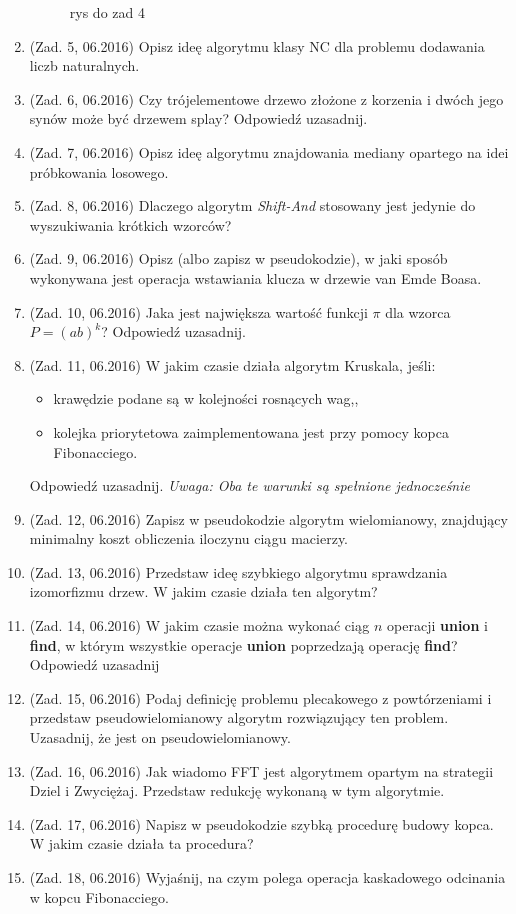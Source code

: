 \documentclass[10pt]{article}%
\begin{document}
\begin{enumerate}
\begin{figure}[H]
\caption{rys do zad 4}
\end{figure} 
\item (Zad. 5, 06.2016) Opisz ideę algorytmu klasy NC dla problemu dodawania liczb naturalnych.
\item (Zad. 6, 06.2016) Czy trójelementowe drzewo złożone z korzenia i dwóch jego synów może być drzewem splay? Odpowiedź uzasadnij.
\item (Zad. 7, 06.2016) Opisz ideę algorytmu znajdowania mediany opartego na idei próbkowania losowego.
\item (Zad. 8, 06.2016) Dlaczego algorytm \textit{Shift-And} stosowany jest jedynie do wyszukiwania krótkich wzorców?
\item (Zad. 9, 06.2016) Opisz (albo zapisz w pseudokodzie), w jaki sposób wykonywana jest operacja wstawiania klucza w drzewie van Emde Boasa.
\item (Zad. 10, 06.2016) Jaka jest największa wartość funkcji $\pi$ dla wzorca $ P = (ab)^k$? Odpowiedź uzasadnij.
\item (Zad. 11, 06.2016) W jakim czasie działa algorytm Kruskala, jeśli:
\begin{itemize}
\item krawędzie podane są w kolejności rosnących wag,,
\item kolejka priorytetowa zaimplementowana jest przy pomocy kopca Fibonacciego.
\end{itemize}
Odpowiedź uzasadnij. \textit{Uwaga: Oba te warunki są spełnione jednocześnie}
\item (Zad. 12, 06.2016) Zapisz w pseudokodzie algorytm wielomianowy, znajdujący minimalny koszt obliczenia iloczynu ciągu macierzy.
\item (Zad. 13, 06.2016) Przedstaw ideę szybkiego algorytmu sprawdzania izomorfizmu drzew. W jakim czasie działa ten algorytm?
\item (Zad. 14, 06.2016) W jakim czasie można wykonać ciąg $n$ operacji \textbf{union} i \textbf{find}, w którym wszystkie operacje \textbf{union} poprzedzają operację \textbf{find}? Odpowiedź uzasadnij 
\item (Zad. 15, 06.2016) Podaj definicję problemu plecakowego z powtórzeniami i przedstaw pseudowielomianowy algorytm rozwiązujący ten problem. Uzasadnij, że jest on pseudowielomianowy.
\item (Zad. 16, 06.2016) Jak wiadomo FFT jest algorytmem opartym na strategii Dziel i Zwyciężaj. Przedstaw redukcję wykonaną w tym algorytmie.
\item (Zad. 17, 06.2016) Napisz w pseudokodzie szybką procedurę budowy kopca. W jakim czasie działa ta procedura?
\item (Zad. 18, 06.2016) Wyjaśnij, na czym polega operacja kaskadowego odcinania w kopcu Fibonacciego.


\end{enumerate}
\end{document}
